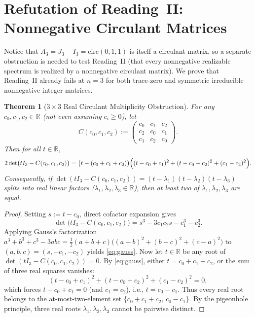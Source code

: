 \documentclass[11pt]{article}
\newtheorem{theorem}{Theorem}[section]
\theoremstyle{definition}
\theoremstyle{remark}
\begin{document}
\section{Refutation of Reading~II: Nonnegative Circulant Matrices}

Notice that $A_3 = J_3 - I_3 = \mathrm{circ}(0, 1, 1)$ is itself a circulant matrix, so a
separate obstruction is needed to test Reading~II (that every nonnegative realizable
spectrum is realized by a nonnegative circulant matrix). We prove that Reading~II already
fails at $n = 3$ for both trace-zero and symmetric irreducible nonnegative integer
matrices.

\begin{theorem}[$3 \times 3$ Real Circulant Multiplicity Obstruction]\label{thm:circulant}
For any $c_0, c_1, c_2 \in \mathbb{R}$ (not even assuming $c_i \ge 0$), let
\[
  C(c_0, c_1, c_2) := \begin{pmatrix}
    c_0 & c_1 & c_2 \\
    c_2 & c_0 & c_1 \\
    c_1 & c_2 & c_0
  \end{pmatrix}.
\]
Then for all $t \in \mathbb{R}$,
\begin{equation}\label{eq:gauss}
  2 \det\bigl(t I_3 - C(c_0, c_1, c_2)\bigr)
  = \bigl(t - (c_0 + c_1 + c_2)\bigr)
    \Bigl((t - c_0 + c_1)^2 + (t - c_0 + c_2)^2 + (c_1 - c_2)^2\Bigr).
\end{equation}
Consequently, if $\det(t I_3 - C(c_0, c_1, c_2)) = (t - \lambda_1)(t - \lambda_2)
(t - \lambda_3)$ splits into real linear factors ($\lambda_1, \lambda_2, \lambda_3 \in
\mathbb{R}$), then at least two of $\lambda_1, \lambda_2, \lambda_3$ are equal.
\end{theorem}

\begin{proof}
Setting $s := t - c_0$, direct cofactor expansion gives
\[
  \det\bigl(t I_3 - C(c_0, c_1, c_2)\bigr) = s^3 - 3 c_1 c_2 s - c_1^3 - c_2^3.
\]
Applying Gauss's factorization $a^3 + b^3 + c^3 - 3abc = \frac{1}{2}(a + b + c)\bigl((a -
b)^2 + (b - c)^2 + (c - a)^2\bigr)$ to $(a, b, c) = (s, -c_1, -c_2)$ yields
\eqref{eq:gauss}. Now let $t \in \mathbb{R}$ be any root of $\det(t I_3 - C(c_0, c_1, c_2))
= 0$. By \eqref{eq:gauss}, either $t = c_0 + c_1 + c_2$, or the sum of three real squares
vanishes:
\[
  (t - c_0 + c_1)^2 + (t - c_0 + c_2)^2 + (c_1 - c_2)^2 = 0,
\]
which forces $t - c_0 + c_1 = 0$ (and $c_1 = c_2$), i.e., $t = c_0 - c_1$. Thus every real
root belongs to the at-most-two-element set $\{c_0 + c_1 + c_2, \, c_0 - c_1\}$. By the
pigeonhole principle, three real roots $\lambda_1, \lambda_2, \lambda_3$ cannot be pairwise
distinct.
\end{proof}
\end{document}
